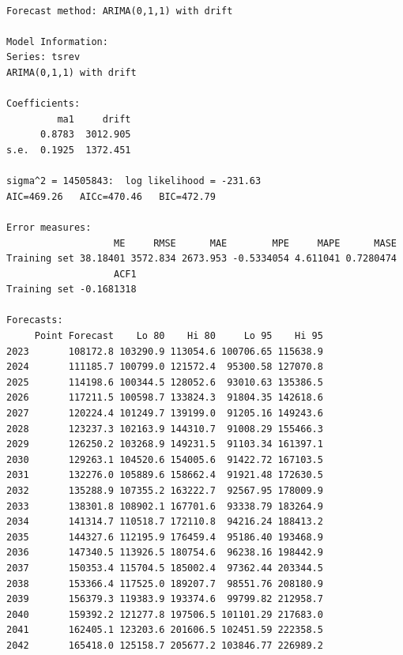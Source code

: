 \documentclass[
  letterpaper,
  DIV=11,
  numbers=noendperiod]{scrreport}
\begin{document}
\begin{verbatim}

Forecast method: ARIMA(0,1,1) with drift

Model Information:
Series: tsrev 
ARIMA(0,1,1) with drift 

Coefficients:
         ma1     drift
      0.8783  3012.905
s.e.  0.1925  1372.451

sigma^2 = 14505843:  log likelihood = -231.63
AIC=469.26   AICc=470.46   BIC=472.79

Error measures:
                   ME     RMSE      MAE        MPE     MAPE      MASE
Training set 38.18401 3572.834 2673.953 -0.5334054 4.611041 0.7280474
                   ACF1
Training set -0.1681318

Forecasts:
     Point Forecast    Lo 80    Hi 80     Lo 95    Hi 95
2023       108172.8 103290.9 113054.6 100706.65 115638.9
2024       111185.7 100799.0 121572.4  95300.58 127070.8
2025       114198.6 100344.5 128052.6  93010.63 135386.5
2026       117211.5 100598.7 133824.3  91804.35 142618.6
2027       120224.4 101249.7 139199.0  91205.16 149243.6
2028       123237.3 102163.9 144310.7  91008.29 155466.3
2029       126250.2 103268.9 149231.5  91103.34 161397.1
2030       129263.1 104520.6 154005.6  91422.72 167103.5
2031       132276.0 105889.6 158662.4  91921.48 172630.5
2032       135288.9 107355.2 163222.7  92567.95 178009.9
2033       138301.8 108902.1 167701.6  93338.79 183264.9
2034       141314.7 110518.7 172110.8  94216.24 188413.2
2035       144327.6 112195.9 176459.4  95186.40 193468.9
2036       147340.5 113926.5 180754.6  96238.16 198442.9
2037       150353.4 115704.5 185002.4  97362.44 203344.5
2038       153366.4 117525.0 189207.7  98551.76 208180.9
2039       156379.3 119383.9 193374.6  99799.82 212958.7
2040       159392.2 121277.8 197506.5 101101.29 217683.0
2041       162405.1 123203.6 201606.5 102451.59 222358.5
2042       165418.0 125158.7 205677.2 103846.77 226989.2
\end{verbatim}
\end{document}

